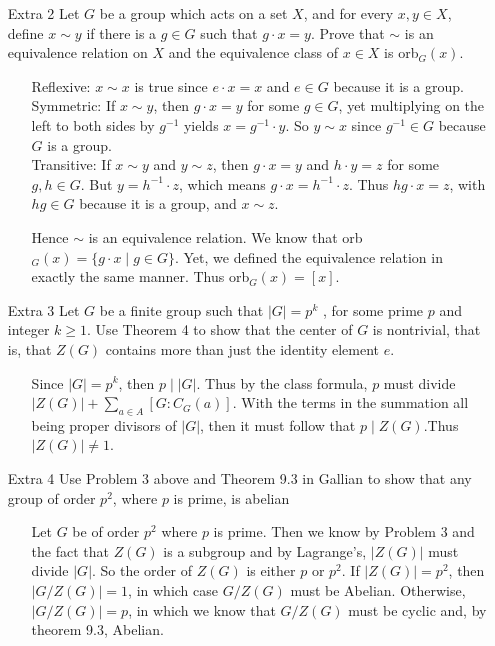 \documentclass[12pt]{article}
\begin{document}
\begin{enumerate}
\item[Extra 2] Let $G$ be a group which acts on a set $X$, and for every $x, y \in X$, define
$x \sim y$ if there is a $g \in G$ such that $g \cdot x = y$. Prove that $\sim$ is an equivalence relation on $X$ and the equivalence class of $x \in X$ is orb$_G(x)$.
\begin{enumerate}
\item[] Reflexive: $x \sim x$ is true since $e \cdot x = x$ and $e \in G$ because it is a group. \\
Symmetric: If $x \sim y$, then $g \cdot x = y$ for some $g \in G$, yet multiplying on the left to both
sides by $g^{-1}$ yields $x = g^{-1} \cdot y$. So $y \sim x$ since $g^{-1} \in G$ because $G$ is a group. \\
Transitive: If $x \sim y$ and $y \sim z$, then $g \cdot x = y$ and $h \cdot y = z$ for some $g, h \in G$. 
But $y = h^{-1} \cdot z$, which means $g \cdot x = h^{-1} \cdot z$. Thus $hg \cdot x = z$, with $hg \in G$ because
it is a group, and $x \sim z$. 

Hence $\sim$ is an equivalence relation.
We know that orb$_G(x) = \{ g \cdot x \mid g \in G \}$. Yet, we defined the equivalence relation in exactly
the same manner. Thus orb$_G(x) = [x]$.
\end{enumerate}

\item[Extra 3] Let $G$ be a finite group such that $|G| = p^k$ , for some prime $p$ and integer
$k \geq 1$. Use Theorem 4 to show that the center of $G$ is nontrivial, that is,
that $Z(G)$ contains more than just the identity element $e$.
\begin{enumerate}
\item[] Since $|G| = p^k$, then $p \mid |G|$. Thus by the class formula, $p$ must divide 
$|Z(G)| + \sum_{a \in A}[G : C_G(a)]$. With the terms in the summation all being proper divisors of $|G|$, then
it must follow that $p \mid Z(G)$.Thus $|Z(G)| \neq 1$.
\end{enumerate}

\item[Extra 4] Use Problem 3 above and Theorem 9.3 in Gallian to show that any
group of order $p^2$, where $p$ is prime, is abelian
\begin{enumerate}
\item[] Let $G$ be of order $p^2$ where $p$ is prime. Then we know by Problem 3 and the fact that $Z(G)$ is a subgroup
and by Lagrange's, $|Z(G)|$ must divide $|G|$. So the order of $Z(G)$ is either $p$ or $p^2$. If $|Z(G)| = p^2$, then
$|G/Z(G)| = 1$, in which case $G/Z(G)$ must be Abelian. Otherwise, $|G/Z(G)| = p$, in which we know that $G/Z(G)$ must be
cyclic and, by theorem 9.3, Abelian.
\end{enumerate}


\end{enumerate}
\end{document}

